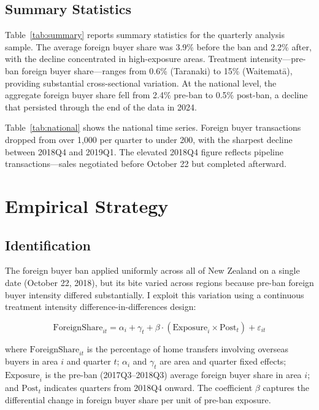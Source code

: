 \documentclass[12pt]{article}
\begin{document}
\subsection{Summary Statistics}



Table~\ref{tab:summary} reports summary statistics for the quarterly analysis sample. The average foreign buyer share was 3.9\% before the ban and 2.2\% after, with the decline concentrated in high-exposure areas. Treatment intensity---pre-ban foreign buyer share---ranges from 0.6\% (Taranaki) to 15\% (Waitemat\=a), providing substantial cross-sectional variation. At the national level, the aggregate foreign buyer share fell from 2.4\% pre-ban to 0.5\% post-ban, a decline that persisted through the end of the data in 2024.



Table~\ref{tab:national} shows the national time series. Foreign buyer transactions dropped from over 1,000 per quarter to under 200, with the sharpest decline between 2018Q4 and 2019Q1. The elevated 2018Q4 figure reflects pipeline transactions---sales negotiated before October 22 but completed afterward.

\section{Empirical Strategy}

\subsection{Identification}

The foreign buyer ban applied uniformly across all of New Zealand on a single date (October 22, 2018), but its bite varied across regions because pre-ban foreign buyer intensity differed substantially. I exploit this variation using a continuous treatment intensity difference-in-differences design:

\begin{equation}
\text{ForeignShare}_{it} = \alpha_i + \gamma_t + \beta \cdot (\text{Exposure}_i \times \text{Post}_t) + \varepsilon_{it}
\label{eq:main}
\end{equation}

where $\text{ForeignShare}_{it}$ is the percentage of home transfers involving overseas buyers in area $i$ and quarter $t$; $\alpha_i$ and $\gamma_t$ are area and quarter fixed effects; $\text{Exposure}_i$ is the pre-ban (2017Q3--2018Q3) average foreign buyer share in area $i$; and $\text{Post}_t$ indicates quarters from 2018Q4 onward. The coefficient $\beta$ captures the differential change in foreign buyer share per unit of pre-ban exposure.
\end{document}
